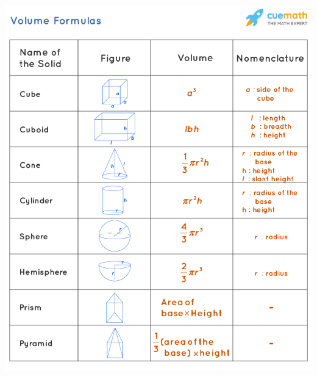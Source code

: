 \documentclass[8pt]{article}
\begin{document}
\begin{multicols*}{2}
\begin{minipage}{\linewidth-4cm}
      \includegraphics[width=\linewidth]{./media/volume.png}
    \end{minipage}
    \columnbreak
    \begin{minipage}{\linewidth-3cm}

\end{minipage}
\end{multicols*}
\end{document}

